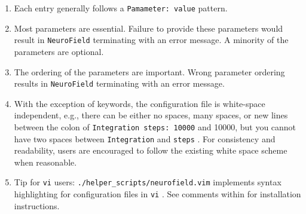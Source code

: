 \documentclass[12pt,a4paper]{article}
\newcommand{\type}[1]{ {\small\small\tt #1} }
\newcommand{\NF}[0]{ \type{NeuroField}}
\begin{document}
\begin{enumerate}
	\item Each entry generally follows a \type{Pamameter: value} pattern.
	\item Most parameters are essential. Failure to provide these parameters would result in \NF terminating with an error message. A minority of the parameters are optional.
	\item The ordering of the parameters are important. Wrong parameter ordering results in \NF terminating with an error message.
	\item With the exception of keywords, the configuration file is white-space independent, e.g., there can be either no spaces, many spaces, or new lines between the colon of \type{Integration steps: 10000} and 10000, but you cannot have two spaces between \type{Integration} and \type{steps}. For consistency and readability, users are encouraged to follow the existing white space scheme when reasonable.
	\item Tip for \type{vi} users: \type{./helper\_scripts/neurofield.vim} implements syntax highlighting for configuration files in \type{vi}. See comments within for installation instructions.
\end{enumerate}
\end{document}
